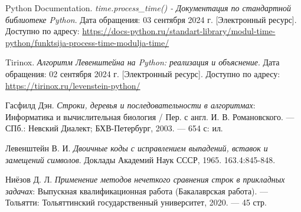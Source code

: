 \begin{thebibliography}{9}
     Python Documentation. \textit{time.process\_time() - Документация по стандартной библиотеке Python}. Дата обращения: 03 сентября 2024 г. [Электронный ресурс]. Доступно по адресу: \url{https://docs-python.ru/standart-library/modul-time-python/funktsija-process-time-modulja-time/}
    
     Tirinox. \textit{Алгоритм Левенштейна на Python: реализация и объяснение}. Дата обращения: 02 сентября 2024 г. [Электронный ресурс]. Доступно по адресу: \url{https://tirinox.ru/levenstein-python/}
    
     Гасфилд Дэн. \textit{Строки, деревья и последовательности в алгоритмах}: Информатика и вычислительная биология / Пер. с англ. И. В. Романовского. — СПб.: Невский Диалект; БХВ-Петербург, 2003. — 654 с: ил.
    
     Левенштейн В. И. \textit{Двоичные коды с исправлением выпадений, вставок и замещений символов}. Доклады Академий Наук СССР, 1965. 163.4:845-848.
    
     Ниёзов Д. Л. \textit{Применение методов нечеткого сравнения строк в прикладных задачах}: Выпускная квалификационная работа (Бакалаврская работа). — Тольятти: Тольяттинский государственный университет, 2020. — 45 стр.
    
\end{thebibliography}